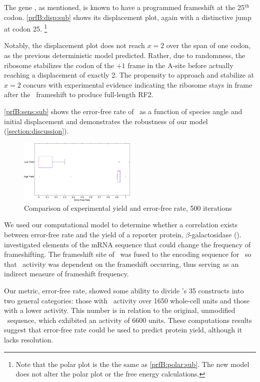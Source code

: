 \documentclass[12pt]{article}
\begin{document}
The gene \prfB, as mentioned, is known
to have a programmed frameshift at the 25$^{\textrm{th}}$ codon.
\autoref{prfB:disp:sub} shows its displacement plot,
again with a distinctive jump at codon 25.
\footnote{Note that the polar plot is the the same as \autoref{prfB:polar:sub}.
The new model does not alter the polar plot or the free energy calculations.}

Notably, the displacement plot does not reach $x=2$ over the span of
one codon, as the previous deterministic model predicted.  Rather, due to randomness, the
ribosome stabilizes the codon of the $+1$ frame in the A-site before actually reaching
a displacement of exactly 2.  The propensity to approach and stabilize at $x=2$
concurs with experimental evidence indicating the ribosome
stays in frame after the \prfB\ frameshift to produce full-length RF2.
  
\autoref{prfB:sens:sub} shows the error-free rate of \prfB\ as a function
of species angle and initial displacement and demonstrates the
robustness of our model (\autoref{section:discussion}).

\begin{figure}
  \caption{Comparison of experimental yield and error-free rate, 500 iterations}
  \label{weissboxplot}
  \includegraphics[width=0.5\textwidth]{histograms/weissbox}
\end{figure}

We used our computational model to determine whether a correlation exists between 
error-free rate and the yield of a reporter protein, $\beta$-galactosidase (\bgals).  
\citet{weiss87} investigated elements of the mRNA sequence that could change the frequency 
of frameshifting.  The frameshift site of \prfB\ was fused to the encoding sequence for 
\bgals\ so that \bgals\ activity was dependent on the frameshift occurring, 
thus serving as an indirect measure of frameshift frequency.  

Our metric, error-free rate, showed some ability to divide \citeauthor{weiss87}'s 35 constructs into 
two general categories: those with \bgals\ activity over 1650 whole-cell units and those with a 
lower activity.  This number is in relation to the original, unmodified \prfB\ sequence, 
which exhibited an activity of 6600 units.  These computations results suggest that 
error-free rate could be used to predict protein yield, although it lacks resolution.
\end{document}
